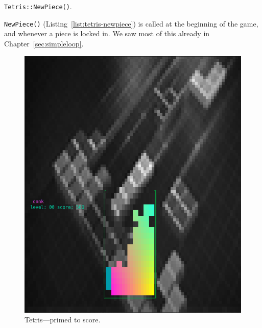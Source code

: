 \begin{listing}[!htb]
\inputminted[]{C}{code-tetris/newpiece.h}
\caption{\texttt{Tetris::NewPiece()}.}
\label{list:tetris-newpiece}
\end{listing}

\texttt{NewPiece()} (Listing~\ref{list:tetris-newpiece}) is called at the
beginning of the game, and whenever a piece is locked in. We saw most of this
already in Chapter~\ref{sec:simpleloop}.

\begin{figure}
  \centering
  \begin{minipage}{0.45\textwidth}
    \includegraphics[width=1\linewidth]{media/tetris-prescore.png}
    \caption{Tetris---primed to score.}
  \end{minipage}\hfill
  \begin{minipage}{0.45\textwidth}

\end{minipage}
\end{figure}
